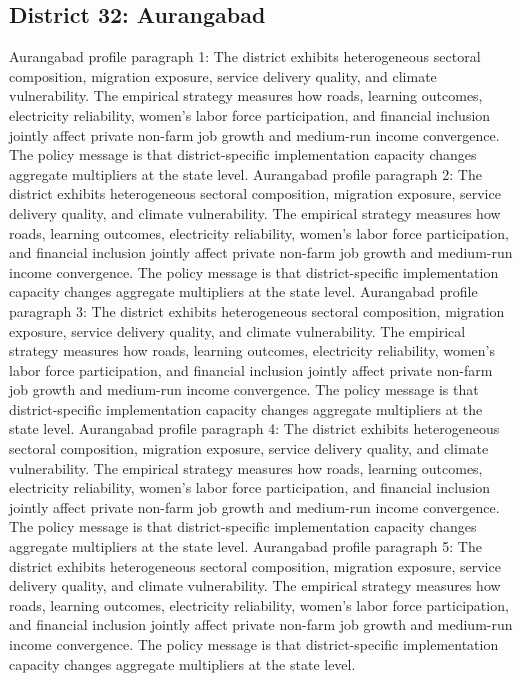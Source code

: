 \documentclass[preprint,12pt]{elsarticle}
\begin{document}
\subsection{District 32: Aurangabad}
Aurangabad profile paragraph 1: The district exhibits heterogeneous sectoral composition, migration exposure, service delivery quality, and climate vulnerability. The empirical strategy measures how roads, learning outcomes, electricity reliability, women's labor force participation, and financial inclusion jointly affect private non-farm job growth and medium-run income convergence. The policy message is that district-specific implementation capacity changes aggregate multipliers at the state level.
Aurangabad profile paragraph 2: The district exhibits heterogeneous sectoral composition, migration exposure, service delivery quality, and climate vulnerability. The empirical strategy measures how roads, learning outcomes, electricity reliability, women's labor force participation, and financial inclusion jointly affect private non-farm job growth and medium-run income convergence. The policy message is that district-specific implementation capacity changes aggregate multipliers at the state level.
Aurangabad profile paragraph 3: The district exhibits heterogeneous sectoral composition, migration exposure, service delivery quality, and climate vulnerability. The empirical strategy measures how roads, learning outcomes, electricity reliability, women's labor force participation, and financial inclusion jointly affect private non-farm job growth and medium-run income convergence. The policy message is that district-specific implementation capacity changes aggregate multipliers at the state level.
Aurangabad profile paragraph 4: The district exhibits heterogeneous sectoral composition, migration exposure, service delivery quality, and climate vulnerability. The empirical strategy measures how roads, learning outcomes, electricity reliability, women's labor force participation, and financial inclusion jointly affect private non-farm job growth and medium-run income convergence. The policy message is that district-specific implementation capacity changes aggregate multipliers at the state level.
Aurangabad profile paragraph 5: The district exhibits heterogeneous sectoral composition, migration exposure, service delivery quality, and climate vulnerability. The empirical strategy measures how roads, learning outcomes, electricity reliability, women's labor force participation, and financial inclusion jointly affect private non-farm job growth and medium-run income convergence. The policy message is that district-specific implementation capacity changes aggregate multipliers at the state level.
\end{document}
